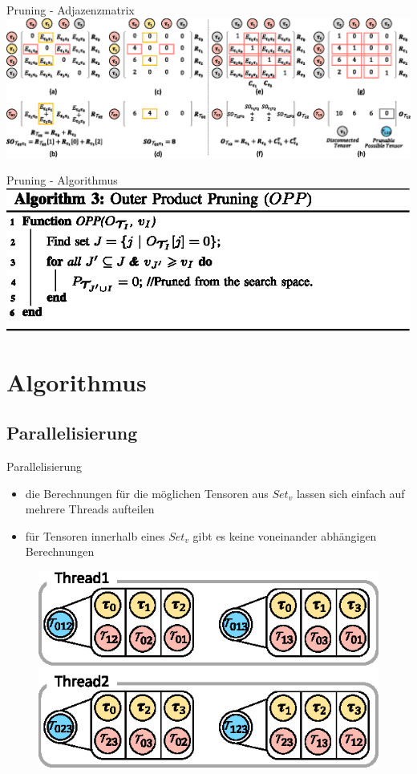 \documentclass{beamer}
\begin{document}
\begin{frame}{Pruning - Adjazenzmatrix}
	\includegraphics[scale=0.2]{figure_05}
\end{frame}

\begin{frame}{Pruning - Algorithmus}
	\includegraphics[scale=0.25]{algorithm_03}
\end{frame}
\note[itemize]{
	\item
}
\section{Algorithmus}
\subsection{Parallelisierung}

\begin{frame}{Parallelisierung}
	\begin{itemize}
		\item die Berechnungen für die möglichen Tensoren aus $Set_v$ lassen sich einfach auf mehrere Threads aufteilen
		\item für Tensoren innerhalb eines $Set_v$ gibt es keine voneinander abhängigen Berechnungen
	\end{itemize}
	\begin{figure}
		\includegraphics{figure_07}
	\end{figure}
\end{frame}
\end{document}
